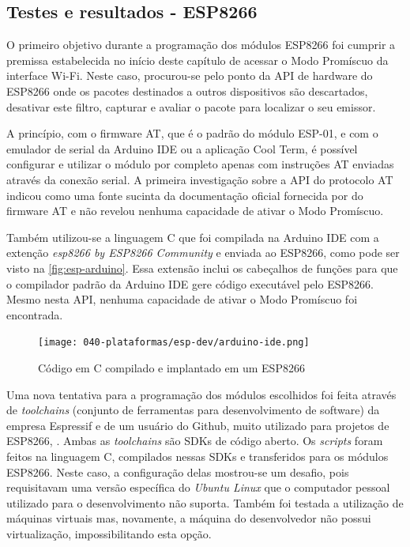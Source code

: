 \begin{figure}[htb]
\begin{minipage}{0.49\textwidth}
	\end{minipage}
\end{figure}

\FloatBarrier
\subsection{Testes e resultados - ESP8266}
\label{subsec:testes-esp}

O primeiro objetivo durante a programação dos módulos ESP8266 foi cumprir a
premissa  estabelecida no início deste capítulo de acessar o Modo Promíscuo da
interface Wi-Fi. Neste caso, procurou-se pelo ponto da API de
hardware do ESP8266 onde os pacotes destinados a outros dispositivos são
descartados, desativar este filtro, capturar e avaliar o pacote para localizar o
seu emissor.

A princípio, com o firmware AT, que é o padrão do módulo ESP-01, e com o
emulador de serial da Arduino IDE ou a aplicação Cool Term, é
possível configurar e utilizar o módulo por completo apenas com instruções AT
enviadas através da conexão serial. A primeira investigação sobre a API do protocolo
AT indicou  como uma fonte sucinta da documentação
oficial fornecida por  do firmware AT e
não revelou nenhuma capacidade de ativar o Modo Promíscuo.

Também utilizou-se a linguagem C que foi compilada na Arduino IDE  com a
extenção \emph{esp8266 by ESP8266 Community} e enviada ao ESP8266, como pode ser
visto na \autoref{fig:esp-arduino}. Essa extensão inclui os cabeçalhos de
funções para que o compilador padrão da Arduino IDE gere código  executável pelo
ESP8266. Mesmo nesta API, nenhuma capacidade de ativar o Modo Promíscuo foi
encontrada.

\begin{figure}[htb]
	\caption{\label{fig:esp-arduino}Código em C compilado e implantado em um ESP8266}
	\begin{center}
		\texttt{[image: 040-plataformas/esp-dev/arduino-ide.png]}
	\end{center}
\end{figure}


Uma nova tentativa para a programação  dos módulos escolhidos foi feita através de
\emph{toolchains} (conjunto de ferramentas para desenvolvimento de software) da
empresa Espressif e de um usuário do Github, muito utilizado para
projetos de ESP8266, . Ambas as \emph{toolchains}
são SDKs de código aberto. Os \emph{scripts} foram feitos na linguagem C,
compilados nessas SDKs e transferidos para os módulos ESP8266. Neste caso,
a configuração delas mostrou-se um desafio, pois requisitavam uma versão
específica do \emph{Ubuntu Linux} que o computador pessoal utilizado para o desenvolvimento
não suporta. Também foi testada a utilização de máquinas virtuais mas, novamente,
a máquina do desenvolvedor não possui virtualização, impossibilitando esta opção.

